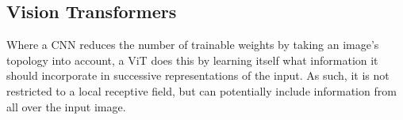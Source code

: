 




\subsection{Vision Transformers}
Where a CNN reduces the number of trainable weights by taking an image's topology into account, a ViT does this by learning itself what information it should incorporate in successive representations of the input. As such, it is not restricted to a local receptive field, but can potentially include information from all over the input image.

